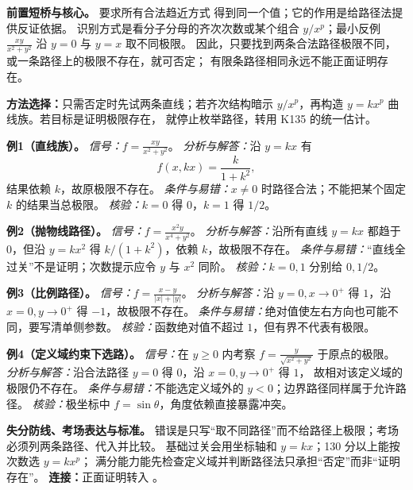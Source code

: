 
\begin{knowledgeBox}
\textbf{前置短桥与核心。}
要求所有合法趋近方式
得到同一个值；它的作用是给路径法提供反证依据。
识别方式是看分子分母的齐次次数或某个组合 \(y/x^p\)；最小反例
\(\frac{xy}{x^2+y^2}\) 沿 \(y=0\) 与 \(y=x\) 取不同极限。
因此，只要找到两条合法路径极限不同，或一条路径上的极限不存在，就可否定；
有限条路径相同永远不能正面证明存在。

\textbf{方法选择：}只需否定时先试两条直线；若齐次结构暗示
\(y/x^p\)，再构造 \(y=kx^p\) 曲线族。若目标是证明极限存在，
就停止枚举路径，转用 K135 的统一估计。

\textbf{例1（直线族）。}
\emph{信号：}\(\displaystyle f=\frac{xy}{x^2+y^2}\)。
\emph{分析与解答：}沿 \(y=kx\) 有
\[
f(x,kx)=\frac{k}{1+k^2},
\]
结果依赖 \(k\)，故原极限不存在。
\emph{条件与易错：}\(x\ne0\) 时路径合法；不能把某个固定 \(k\) 的结果当总极限。
\emph{核验：}\(k=0\) 得 \(0\)，\(k=1\) 得 \(1/2\)。

\textbf{例2（抛物线路径）。}
\emph{信号：}\(\displaystyle f=\frac{x^2y}{x^4+y^2}\)。
\emph{分析与解答：}沿所有直线 \(y=kx\) 都趋于 \(0\)，但沿
\(y=kx^2\) 得 \(k/(1+k^2)\)，依赖 \(k\)，故极限不存在。
\emph{条件与易错：}“直线全过关”不是证明；次数提示应令 \(y\) 与 \(x^2\) 同阶。
\emph{核验：}\(k=0,1\) 分别给 \(0,1/2\)。

\textbf{例3（比例路径）。}
\emph{信号：}\(\displaystyle f=\frac{x-y}{|x|+|y|}\)。
\emph{分析与解答：}沿 \(y=0,x\to0^+\) 得 \(1\)，沿
\(x=0,y\to0^+\) 得 \(-1\)，故极限不存在。
\emph{条件与易错：}绝对值使左右方向也可能不同，要写清单侧参数。
\emph{核验：}函数绝对值不超过 \(1\)，但有界不代表有极限。

\textbf{例4（定义域约束下选路）。}
\emph{信号：}在 \(y\ge0\) 内考察
\(\displaystyle f=\frac{y}{\sqrt{x^2+y^2}}\) 于原点的极限。
\emph{分析与解答：}沿合法路径 \(y=0\) 得 \(0\)，沿 \(x=0,y\to0^+\) 得 \(1\)，
故相对该定义域的极限仍不存在。
\emph{条件与易错：}不能选定义域外的 \(y<0\)；边界路径同样属于允许路径。
\emph{核验：}极坐标中 \(f=\sin\theta\)，角度依赖直接暴露冲突。

\textbf{失分防线、考场表达与标准。}
错误是只写“取不同路径”而不给路径上极限；考场必须列两条路径、代入并比较。
基础过关会用坐标轴和 \(y=kx\)；130 分以上能按次数选 \(y=kx^p\)；
满分能力能先检查定义域并判断路径法只承担“否定”而非“证明存在”。
\textbf{连接：}正面证明转入
。
\end{knowledgeBox}

